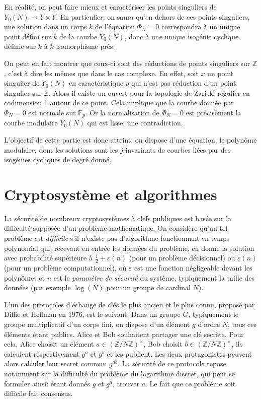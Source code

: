\documentclass[11pt,a4paper]{article}
\newcommand{\Z}{\mathbb{Z}}
\newcommand{\F}{\mathbb{F}}
\newcommand{\vers}{\longrightarrow}
\renewcommand{\v}{\vspace{5mm}}
\theoremstyle{definition}
\begin{document}
En réalité, on peut faire mieux et caractériser les points singuliers de $Y_0(N)\vers Y\times Y$. En particulier, on saura qu'en dehors de ces points singuliers, une solution dans un corps $k$ de l'équation $\Phi_N = 0$ correspondra à un unique point défini sur $k$ de la courbe $Y_0(N)$, donc à une unique isogénie cyclique définie sur $k$ à $\bar{k}$-isomorphisme près.

On peut en fait montrer que ceux-ci sont des réductions de points singuliers sur $\Z$, c'est à dire les mêmes que dans le cas complexe. En effet, soit $x$ un point singulier de $Y_0(N)$ en caractéristique $p$ qui n'est pas réduction d'un point singulier sur $\Z$. Alors il existe un ouvert pour la topologie de Zariski régulier en codimension 1 autour de ce point. Cela implique que la courbe donnée par $\Phi_N=0$ est normale sur $\F_p$. Or la normalisation de $\Phi_N=0$ est précisément la courbe modulaire $Y_0(N)$ qui est lisse: une contradiction.
\v

L'objectif de cette partie est donc atteint: on dispose d'une équation, le polynôme modulaire, dont les solutions sont les $j$-invariants de courbes liées par des isogénies cycliques de degré donné.

\newpage

\section{Cryptosystème et algorithmes}

La sécurité de nombreux cryptosystèmes à clefs publiques est basée sur la difficulté supposée d'un problème mathématique. On considère qu'un tel problème est \emph{difficile} s'il n'existe pas d'algorithme fonctionnant en temps polynomial qui, recevant en entrée les données du problème, en donne la solution avec probabilité supérieure à $\frac{1}{2}+\varepsilon(n)$ (pour un problème décisionnel) ou $\varepsilon(n)$ (pour un problème computationnel), où $\varepsilon$ est une fonction négligeable devant les polynômes et $n$ est le \emph{paramètre de sécurité} du système, typiquement la taille des données (par exemple $\log(N)$ pour un groupe de cardinal $N$).
\v

L'un des protocoles d'échange de clés le plus ancien et le plus connu, proposé par Diffie et Hellman en 1976, est le suivant. Dans un groupe $G$, typiquement le groupe multiplicatif d'un corps fini, on dispose d'un élément $g$ d'ordre $N$, tous ces éléments étant publics. Alice et Bob souhaitent partager une clé secrète. Pour cela, Alice choisit un élément $a\in (\Z/N\Z)^\times$, Bob choisit $b\in (\Z/N\Z)^\times$, ils calculent respectivement $g^a$ et $g^b$ et les publient. Les deux protagonistes peuvent alors calculer leur secret commun $g^{ab}$. La sécurité de ce protocole repose notamment sur la difficulté du problème du logarithme discret, qui peut se formuler ainsi: étant donnés $g$ et $g^a$, trouver $a$. Le fait que ce problème soit difficile fait consensus.
\v
\end{document}
